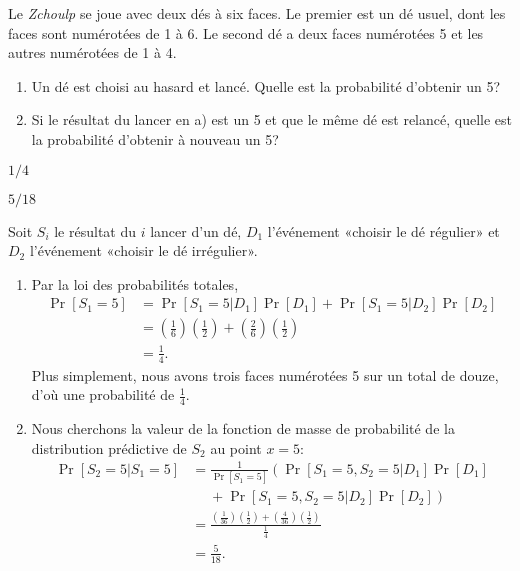 \begin{exercice}
  Le \emph{Zchoulp} se joue avec deux dés à six faces.  Le premier est
  un dé usuel, dont les faces sont numérotées de 1 à 6. Le second dé a
  deux faces numérotées 5 et les autres numérotées de 1 à 4.
  \begin{enumerate}
  \item Un dé est choisi au hasard et lancé. Quelle est la probabilité
    d'obtenir un 5?
  \item Si le résultat du lancer en a) est un 5 et que le même dé est
    relancé, quelle est la probabilité d'obtenir à nouveau un 5?
  \end{enumerate}
  \begin{rep}
    \begin{inparaenum}
    \item $1/4$
    \item $5/18$
    \end{inparaenum}
  \end{rep}
  \begin{sol}
    Soit $S_i$ le résultat du $i${\ieme} lancer d'un dé, $D_1$
    l'événement «choisir le dé régulier» et $D_2$ l'événement «choisir
    le dé irrégulier».
    \begin{enumerate}
    \item Par la loi des probabilités totales,
      \begin{align*}
        \Pr[S_1 = 5]
        &= \Pr[S_1 = 5|D_1] \Pr[D_1] + \Pr[S_1 = 5|D_2] \Pr[D_2] \\
        &= \left(\frac{1}{6}\right) \left(\frac{1}{2}\right)
        + \left(\frac{2}{6}\right) \left(\frac{1}{2}\right) \\
        &= \frac{1}{4}.
      \end{align*}
      Plus simplement, nous avons trois faces numérotées 5 sur un
      total de douze, d'où une probabilité de $\frac{1}{4}$.
    \item Nous cherchons la valeur de la fonction de masse de
      probabilité de la distribution prédictive de $S_2$ au point
      $x = 5$:
      \begin{align*}
        \Pr[S_2 = 5|S_1 = 5]
        &= \frac{1}{\Pr[S_1 = 5]}
        \left(
          \Pr[S_1 = 5, S_2 = 5|D_1] \Pr[D_1]
        \right. \\
        & \quad\; +
        \left.
          \Pr[S_1 = 5, S_2 = 5|D_2] \Pr[D_2]
        \right) \\
        &= \frac{(\frac{1}{36}) (\frac{1}{2})
          + (\frac{4}{36}) (\frac{1}{2})}{\frac{1}{4}} \\
        &= \frac{5}{18}.
      \end{align*}
    \end{enumerate}
  \end{sol}
\end{exercice}

